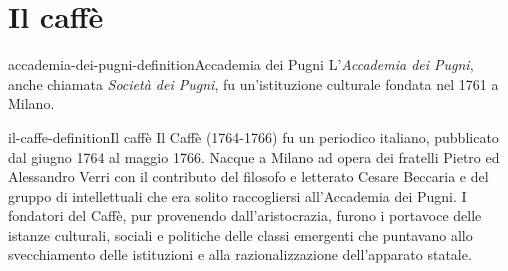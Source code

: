 \documentclass[preview]{standalone}
\begin{document}
\genpage

\section{Il caffè}

\begin{snippetdefinition}{accademia-dei-pugni-definition}{Accademia dei Pugni}
    L'\textit{Accademia dei Pugni}, anche chiamata \textit{Società dei Pugni},
    fu un'istituzione culturale fondata nel 1761 a Milano.
\end{snippetdefinition}

\begin{snippetdefinition}{il-caffe-definition}{Il caffè}
    Il Caffè (1764-1766) fu un periodico italiano, pubblicato dal giugno 1764 al maggio 1766.
    Nacque a Milano ad opera dei fratelli Pietro ed Alessandro Verri con il contributo del
    filosofo e letterato Cesare Beccaria e del gruppo di intellettuali che era solito raccogliersi
    all'Accademia dei Pugni. I fondatori del Caffè, pur provenendo dall'aristocrazia,
    furono i portavoce delle istanze culturali, sociali e politiche delle classi emergenti che
    puntavano allo svecchiamento delle istituzioni e alla razionalizzazione dell'apparato statale.
\end{snippetdefinition}

\end{document}
